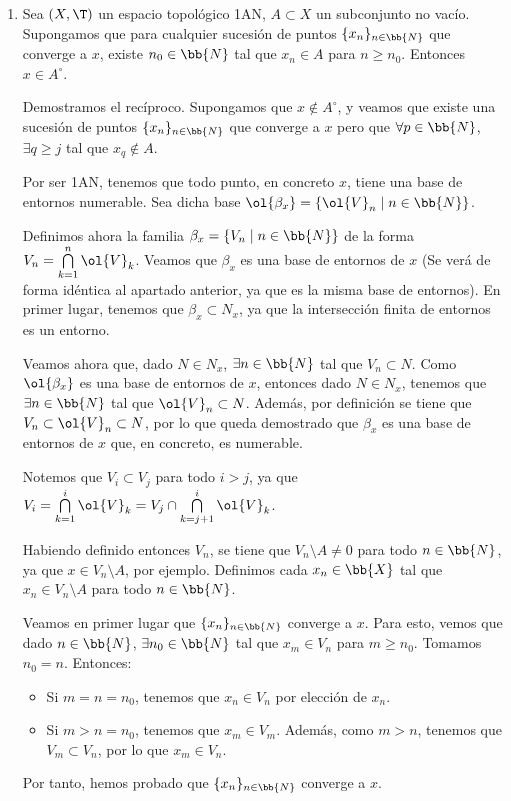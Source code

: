 \begin{ejercicio}
\begin{enumerate}[label=\alph*)]
        \item Sea $(X,\T)$ un espacio topológico 1AN, $A\subset X$ un subconjunto no vacío. Supongamos que para cualquier sucesión de puntos $\{x_n\}_{n\in \bb{N}}$ que converge a $x$, existe $n_0\in \bb{N}$ tal que $x_n\in A$ para $n\geq n_0$. Entonces $x\in A^\circ$.

        Demostramos el recíproco. Supongamos que $x\notin A^\circ$, y veamos que existe una sucesión de puntos $\{x_n\}_{n\in \bb{N}}$ que converge a $x$ pero que $\forall p\in \bb{N}$, $\exists q\geq j$ tal que $x_q\notin A$.

        Por ser 1AN, tenemos que todo punto, en concreto $x$, tiene una base de entornos numerable. Sea dicha base $\ol{\beta_x}=\{\ol{V}_n\mid n\in \bb{N}\}$.

        Definimos ahora la familia $\beta_x=\{V_n \mid n\in \bb{N}\}$ de la forma $V_n=\bigcap\limits_{k=1}^n \ol{V}_k$. Veamos que $\beta_x$ es una base de entornos de $x$ (Se verá de forma idéntica al apartado anterior, ya que es la misma base de entornos). En primer lugar, tenemos que $\beta_x\subset N_x$, ya que la intersección finita de entornos es un entorno.
        
        Veamos ahora que, dado $N\in N_x$, $\exists n\in \bb{N}$ tal que $V_n\subset N$. Como $\ol{\beta_x}$ es una base de entornos de $x$, entonces dado $N\in N_x$, tenemos que $\exists n\in \bb{N}$ tal que $\ol{V}_n\subset N$. Además, por definición se tiene que $V_n\subset \ol{V}_n \subset N$, por lo que queda demostrado que $\beta_x$ es una base de entornos de $x$ que, en concreto, es numerable.

        Notemos que $V_i\subset V_j$ para todo $i>j$, ya que $V_i=\bigcap\limits_{k=1}^i \ol{V}_k=V_j\cap \bigcap\limits_{k=j+1}^i \ol{V}_k$.

        Habiendo definido entonces $V_n$, se tiene que $V_n\setminus A\neq 0$ para todo $n\in \bb{N}$, ya que $x\in V_n\setminus A$, por ejemplo. Definimos cada $x_n\in \bb{X}$ tal que $x_n\in V_n\setminus A$ para todo $n\in \bb{N}$.

        Veamos en primer lugar que $\{x_n\}_{n\in \bb{N}}$ converge a $x$. Para esto, vemos que dado $n\in \bb{N}$, $\exists n_0\in \bb{N}$ tal que $x_m\in V_n$ para $m\geq n_0$. Tomamos $n_0=n$. Entonces:
        \begin{itemize}
            \item Si $m=n=n_0$, tenemos que $x_n\in V_n$ por elección de $x_n$.
            \item Si $m>n=n_0$, tenemos que $x_m\in V_m$. Además, como $m>n$, tenemos que $V_m\subset V_n$, por lo que $x_m\in V_n$.
        \end{itemize}
        Por tanto, hemos probado que $\{x_n\}_{n\in \bb{N}}$ converge a $x$.


\end{enumerate}
\end{ejercicio}
